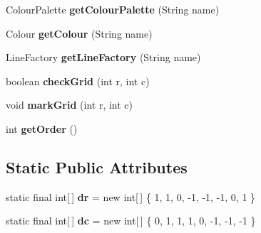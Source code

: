 \begin{DoxyCompactItemize}
\item 
\hypertarget{classdev_1_1boxy_1_1fortyfive_1_1core_1_1scene_1_1_scene_a804014f14be67b81812efaaec6f65c46}{
ColourPalette {\bfseries getColourPalette} (String name)}
\label{d6/d2d/classdev_1_1boxy_1_1fortyfive_1_1core_1_1scene_1_1_scene_a804014f14be67b81812efaaec6f65c46}

\item 
\hypertarget{classdev_1_1boxy_1_1fortyfive_1_1core_1_1scene_1_1_scene_ad55b12624294bafa721636ee96c1a9ea}{
Colour {\bfseries getColour} (String name)}
\label{d6/d2d/classdev_1_1boxy_1_1fortyfive_1_1core_1_1scene_1_1_scene_ad55b12624294bafa721636ee96c1a9ea}

\item 
\hypertarget{classdev_1_1boxy_1_1fortyfive_1_1core_1_1scene_1_1_scene_a9776f256757933650a8337400d2a650b}{
LineFactory {\bfseries getLineFactory} (String name)}
\label{d6/d2d/classdev_1_1boxy_1_1fortyfive_1_1core_1_1scene_1_1_scene_a9776f256757933650a8337400d2a650b}

\item 
\hypertarget{classdev_1_1boxy_1_1fortyfive_1_1core_1_1scene_1_1_scene_a84c3c8197d649d283967225bf78c0f1f}{
boolean {\bfseries checkGrid} (int r, int c)}
\label{d6/d2d/classdev_1_1boxy_1_1fortyfive_1_1core_1_1scene_1_1_scene_a84c3c8197d649d283967225bf78c0f1f}

\item 
\hypertarget{classdev_1_1boxy_1_1fortyfive_1_1core_1_1scene_1_1_scene_ae821d490772910644a1a2d7352487be5}{
void {\bfseries markGrid} (int r, int c)}
\label{d6/d2d/classdev_1_1boxy_1_1fortyfive_1_1core_1_1scene_1_1_scene_ae821d490772910644a1a2d7352487be5}

\item 
\hypertarget{classdev_1_1boxy_1_1fortyfive_1_1core_1_1scene_1_1_scene_aab7bb1b3a9bafc063440a37223d52dad}{
int {\bfseries getOrder} ()}
\label{d6/d2d/classdev_1_1boxy_1_1fortyfive_1_1core_1_1scene_1_1_scene_aab7bb1b3a9bafc063440a37223d52dad}

\end{DoxyCompactItemize}
\subsection*{Static Public Attributes}
\begin{DoxyCompactItemize}
\item 
\hypertarget{classdev_1_1boxy_1_1fortyfive_1_1core_1_1scene_1_1_scene_ada8282869c8df6bd3ebc909dcd8fd20e}{
static final int\mbox{[}$\,$\mbox{]} {\bfseries dr} = new int\mbox{[}$\,$\mbox{]} \{ 1, 1, 0, -\/1, -\/1, -\/1, 0, 1 \}}
\label{d6/d2d/classdev_1_1boxy_1_1fortyfive_1_1core_1_1scene_1_1_scene_ada8282869c8df6bd3ebc909dcd8fd20e}

\item 
\hypertarget{classdev_1_1boxy_1_1fortyfive_1_1core_1_1scene_1_1_scene_afe0d9588a4beecd77649143d867ed15f}{
static final int\mbox{[}$\,$\mbox{]} {\bfseries dc} = new int\mbox{[}$\,$\mbox{]} \{ 0, 1, 1, 1, 0, -\/1, -\/1, -\/1 \}}
\label{d6/d2d/classdev_1_1boxy_1_1fortyfive_1_1core_1_1scene_1_1_scene_afe0d9588a4beecd77649143d867ed15f}

\end{DoxyCompactItemize}
